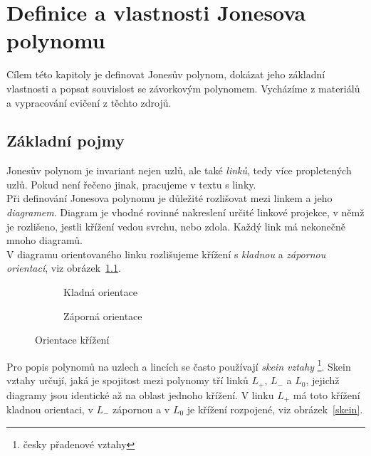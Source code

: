 
\chapter{Definice a vlastnosti Jonesova polynomu}
Cílem této kapitoly je definovat Jonesův polynom, dokázat jeho základní vlastnosti a popsat souvislost se závorkovým polynomem. Vycházíme z materiálů~\cite{cromwell2004knots, Adams2004, jones2005} a vypracování cvičení z těchto zdrojů.
\section{Základní pojmy}
Jonesův polynom je invariant nejen uzlů, ale také \emph{linků}, tedy více propletených uzlů. Pokud není řečeno jinak, pracujeme v textu s linky. \\
Při definování Jonesova polynomu je důležité rozlišovat mezi linkem a jeho \emph{diagramem}. Diagram je vhodné rovinné nakreslení určité linkové projekce, v němž je rozlišeno, jestli křížení vedou svrchu, nebo zdola. Každý link má nekonečně mnoho diagramů.
\\
V diagramu orientovaného linku rozlišujeme křížení s \emph{kladnou} a \emph{zápornou orientací}, viz obrázek~\ref{orientace}.

\begin{figure}[h]  

\centering 
\begin{subfigure}[t]{0.4\linewidth}\centering
{} 
\caption{Kladná orientace} 
\end{subfigure}
\begin{subfigure}[t]{0.4\linewidth}\centering
{}  
\caption{Záporná orientace}
\end{subfigure}
\caption{Orientace křížení} \label{orientace}
\end{figure}  


Pro popis polynomů na uzlech a lincích se často používají \emph{skein vztahy} \footnote{česky přadenové vztahy}.
Skein vztahy určují, jaká je spojitost mezi polynomy tří linků $L_+$, $ L_-$ a $L_0$, jejichž diagramy jsou identické až na oblast jednoho křížení. V linku $L_+$ má toto křížení kladnou orientaci, v $L_-$ zápornou a v $L_0$ je křížení rozpojené, viz obrázek~\ref{skein}.

